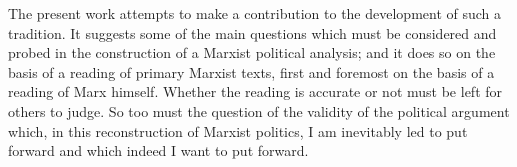 The present work attempts to make a contribution to the development of such a tradition. It suggests some of the main questions which must be considered and probed in the construction of a Marxist political analysis; and it does so on the basis of a reading of primary Marxist texts, first and foremost on the basis of a reading of Marx himself. Whether the reading is accurate or not must be left for others to judge. So too must the question of the validity of the political argument which, in this reconstruction of Marxist politics, I am inevitably led to put forward and which indeed I want to put forward.

